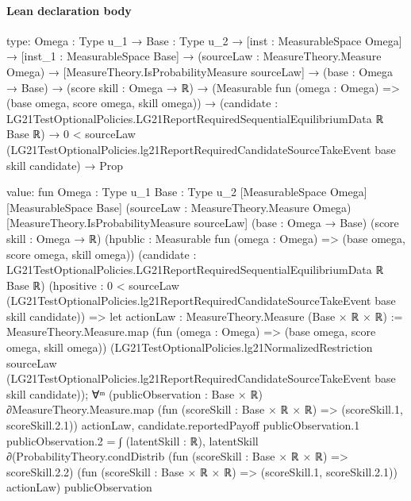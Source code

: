 \documentclass[10pt]{article}
\begin{document}
\paragraph{Lean declaration body}
\begin{ReviewVerbatim}
type:
{Omega : Type u_1} →
  {Base : Type u_2} →
    [inst : MeasurableSpace Omega] →
      [inst_1 : MeasurableSpace Base] →
        (sourceLaw : MeasureTheory.Measure Omega) →
          [MeasureTheory.IsProbabilityMeasure sourceLaw] →
            (base : Omega → Base) →
              (score skill : Omega → ℝ) →
                (Measurable fun (omega : Omega) => (base omega, score omega, skill omega)) →
                  (candidate : LG21TestOptionalPolicies.LG21ReportRequiredSequentialEquilibriumData ℝ Base ℝ) →
                    0 <
                        sourceLaw
                          (LG21TestOptionalPolicies.lg21ReportRequiredCandidateSourceTakeEvent base skill candidate) →
                      Prop

value:
fun {Omega : Type u_1} {Base : Type u_2} [MeasurableSpace Omega] [MeasurableSpace Base]
    (sourceLaw : MeasureTheory.Measure Omega) [MeasureTheory.IsProbabilityMeasure sourceLaw] (base : Omega → Base)
    (score skill : Omega → ℝ) (hpublic : Measurable fun (omega : Omega) => (base omega, score omega, skill omega))
    (candidate : LG21TestOptionalPolicies.LG21ReportRequiredSequentialEquilibriumData ℝ Base ℝ)
    (hpositive :
      0 < sourceLaw (LG21TestOptionalPolicies.lg21ReportRequiredCandidateSourceTakeEvent base skill candidate)) =>
  let actionLaw : MeasureTheory.Measure (Base × ℝ × ℝ) :=
    MeasureTheory.Measure.map (fun (omega : Omega) => (base omega, score omega, skill omega))
      (LG21TestOptionalPolicies.lg21NormalizedRestriction sourceLaw
        (LG21TestOptionalPolicies.lg21ReportRequiredCandidateSourceTakeEvent base skill candidate));
  ∀ᵐ (publicObservation :
    Base × ℝ) ∂MeasureTheory.Measure.map (fun (scoreSkill : Base × ℝ × ℝ) => (scoreSkill.1, scoreSkill.2.1)) actionLaw,
    candidate.reportedPayoff publicObservation.1 publicObservation.2 =
      ∫ (latentSkill : ℝ),
        latentSkill ∂(ProbabilityTheory.condDistrib (fun (scoreSkill : Base × ℝ × ℝ) => scoreSkill.2.2)
            (fun (scoreSkill : Base × ℝ × ℝ) => (scoreSkill.1, scoreSkill.2.1)) actionLaw)
          publicObservation
\end{ReviewVerbatim}
\end{document}

